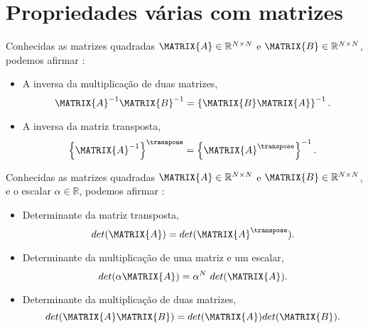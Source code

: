 \section{Propriedades várias com matrizes}


\begin{theorem}\label{theo:matrixgeneric2}
Conhecidas as matrizes quadradas $\MATRIX{A} \in \mathbb{R}^{N \times N}$ e $\MATRIX{B} \in \mathbb{R}^{N \times N}$,
podemos afirmar \cite[pp. 65]{golub2013matrix}:
\begin{itemize}
\item  A inversa da multiplicação de duas matrizes,
\vspace{-6pt}
\begin{equation}
\MATRIX{A}^{-1} \MATRIX{B}^{-1} = \left\{\MATRIX{B}\MATRIX{A}\right\}^{-1}.
\end{equation}
\item A inversa da matriz transposta,
\vspace{-6pt}
\begin{equation}
\left\{\MATRIX{A}^{-1}\right\}^{\transpose}  = \left\{\MATRIX{A}^{\transpose}\right\}^{-1}.
\end{equation}
\end{itemize}
\end{theorem}

\begin{theorem}\label{theo:matrixgeneric1}
Conhecidas as matrizes quadradas $\MATRIX{A} \in \mathbb{R}^{N \times N}$ e $\MATRIX{B} \in \mathbb{R}^{N \times N}$,
e o escalar $\alpha \in \mathbb{R}$, podemos afirmar \cite[pp. 66]{golub2013matrix}:
\begin{itemize}
\item Determinante da matriz transposta,
\begin{equation}
det(\MATRIX{A})=det(\MATRIX{A}^{\transpose}).
\end{equation}
\item Determinante da multiplicação de uma matriz e um escalar,
\begin{equation}
det(\alpha \MATRIX{A})=\alpha^N~det(\MATRIX{A}).
\end{equation}
\item Determinante da multiplicação de duas matrizes,
\begin{equation}
det(\MATRIX{A}\MATRIX{B})=det(\MATRIX{A})det(\MATRIX{B}).
\end{equation}
\end{itemize}
\end{theorem}


